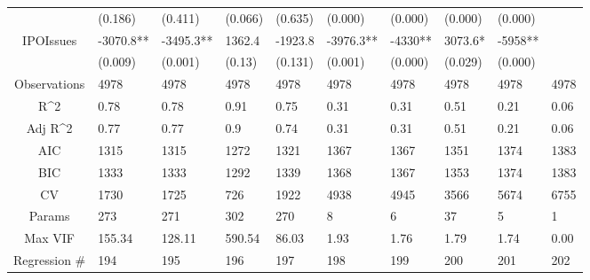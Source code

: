 \documentclass{article}
\begin{document}
\begin{table}[H]
\begin{tabular}{|clllllllll|}
   & (0.186) & (0.411) & (0.066) & (0.635) & (0.000) & (0.000) & (0.000) & (0.000) &  \\ 
  IPOIssues & -3070.8** & -3495.3** & 1362.4 & -1923.8 & -3976.3** & -4330** & 3073.6* & -5958** &  \\ 
   & (0.009) & (0.001) & (0.13) & (0.131) & (0.001) & (0.000) & (0.029) & (0.000) &  \\ 
  \hline 
 Observations & 4978 & 4978 & 4978 & 4978 & 4978 & 4978 & 4978 & 4978 & 4978 \\ 
  R^2 & 0.78 & 0.78 & 0.91 & 0.75 & 0.31 & 0.31 & 0.51 & 0.21 & 0.06 \\ 
  Adj R^2 & 0.77 & 0.77 & 0.9 & 0.74 & 0.31 & 0.31 & 0.51 & 0.21 & 0.06 \\ 
  AIC & 1315 & 1315 & 1272 & 1321 & 1367 & 1367 & 1351 & 1374 & 1383 \\ 
  BIC & 1333 & 1333 & 1292 & 1339 & 1368 & 1367 & 1353 & 1374 & 1383 \\ 
  CV & 1730 & 1725 & 726 & 1922 & 4938 & 4945 & 3566 & 5674 & 6755 \\ 
  Params & 273 & 271 & 302 & 270 & 8 & 6 & 37 & 5 & 1 \\ 
  Max VIF & 155.34 & 128.11 & 590.54 & 86.03 & 1.93 & 1.76 & 1.79 & 1.74 & 0.00 \\ 
  Regression \# & 194 & 195 & 196 & 197 & 198 & 199 & 200 & 201 & 202 \\ 
   \hline
\end{tabular}
 
\end{table}
\end{document}
